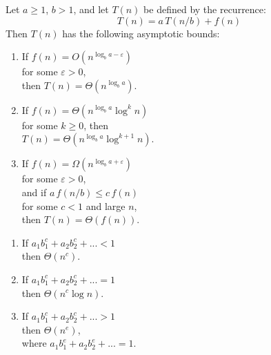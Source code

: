 \documentclass[a4paper,landscape]{article}
\begin{document}
\begin{multicols}{7}
\tcolorbox[mybox={Master Theorem}]
Let \( a \geq 1 \), \( b > 1 \), and let \( T(n) \) be defined by the recurrence:
\[T(n) = a\,T(n/b) + f(n)\]
Then \( T(n) \) has the following asymptotic bounds:
\begin{enumerate}[noitemsep, topsep=0pt]
    \item If \( f(n) = O(n^{\log_b a - \varepsilon}) \) \\ for some \( \varepsilon > 0 \),\\
          then \( T(n) = \Theta(n^{\log_b a}) \).

    \item If \( f(n) = \Theta(n^{\log_b a} \log^k n) \) \\ for some \( k \geq 0 \),
          then \\ \( T(n)=\Theta(n^{\log_b a}\log^{k+1}n) \).

    \item If \( f(n) = \Omega(n^{\log_b a + \varepsilon}) \) \\ for some \( \varepsilon > 0 \),\\
          and if \( a\,f(n/b) \leq c\,f(n) \) \\ for some \( c < 1 \) and large \( n \),\\
          then \( T(n) = \Theta(f(n)) \).
\end{enumerate}
\tcblower
\begin{enumerate}[noitemsep, topsep=0pt]
    \item If \(a_1b_1^c + a_2b_2^c + ...  < 1 \) \\ \hspace*{2mm} then \( \Theta(n^c)\).
    \item If \(a_1b_1^c + a_2b_2^c + ...  = 1\) \\ \hspace*{2mm} then \( \Theta(n^c \log n)\).
    \item If \(a_1b_1^c + a_2b_2^c + ...  > 1 \) \\ \hspace*{2mm} then \( \Theta(n^e)\), \\ where \(a_1b_1^e + a_2b_2^e + ... = 1\).
\end{enumerate}
\endtcolorbox


\end{multicols}
\end{document}
